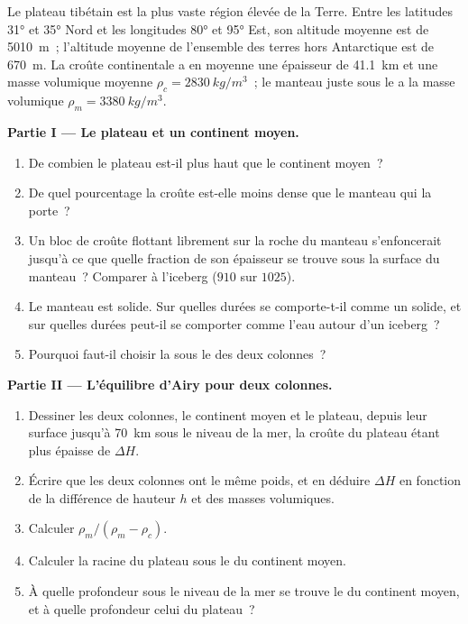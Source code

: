 \begin{problem}
\label{pb:g11:lithosphere-asthenosphere:1}
Le plateau tibétain est la plus vaste région élevée de la Terre. Entre les
latitudes \ang{31} et \ang{35} Nord et les longitudes \ang{80} et \ang{95}
Est, son altitude moyenne est de \qty{5010}{m}~; l'altitude moyenne de
l'ensemble des terres hors Antarctique est de \qty{670}{m}. La croûte
continentale a en moyenne une épaisseur de \qty{41.1}{km} et une masse
volumique moyenne $\rho_c = \qty{2830}{kg/m^3}$~; le manteau juste sous le
 a la masse volumique $\rho_m = \qty{3380}{kg/m^3}$.

\medskip
\noindent\textbf{Partie I --- Le plateau et un continent moyen.}
\begin{enumerate}
  \item De combien le plateau est-il plus haut que le continent moyen~?
  \item De quel pourcentage la croûte est-elle moins dense que le manteau
        qui la porte~?
  \item Un bloc de croûte flottant librement sur la roche du manteau
        s'enfoncerait jusqu'à ce que quelle fraction de son épaisseur se
        trouve sous la surface du manteau~? Comparer à l'iceberg ($910$ sur
        $1025$).
  \item Le manteau est solide. Sur quelles durées se comporte-t-il comme un
        solide, et sur quelles durées peut-il se comporter comme l'eau
        autour d'un iceberg~?
  \item Pourquoi faut-il choisir la  sous le 
        des deux colonnes~?
\end{enumerate}

\medskip
\noindent\textbf{Partie II --- L'équilibre d'Airy pour deux colonnes.}
\begin{enumerate}[resume]
  \item Dessiner les deux colonnes, le continent moyen et le plateau, depuis
        leur surface jusqu'à \qty{70}{km} sous le niveau de la mer, la
        croûte du plateau étant plus épaisse de $\Delta H$.
  \item Écrire que les deux colonnes ont le même poids, et en déduire
        $\Delta H$ en fonction de la différence de hauteur $h$ et des
        masses volumiques.
  \item Calculer $\rho_m/(\rho_m - \rho_c)$.
  \item Calculer la racine du plateau sous le  du continent moyen.
  \item À quelle profondeur sous le niveau de la mer se trouve le  du
        continent moyen, et à quelle profondeur celui du plateau~?
\end{enumerate}


\end{problem}
